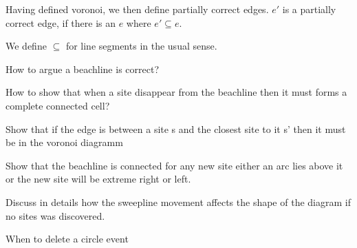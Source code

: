 \documentclass{article}
\begin{document}
Having defined voronoi, we then define partially correct edges. $e'$ is a partially correct edge, if there is an $e$ where $e' \subseteq e$.

We define $\subseteq$ for line segments in the usual sense. 

How to argue a beachline is correct?

How to show that when a site disappear from the beachline then it must forms a complete connected cell?

Show that if the edge is between a site s and the closest site to it s' then it must be in the voronoi diagramm

Show that the beachline is connected for any new site either an arc lies above it or the new site will be extreme right or left.

Discuss in details how the sweepline movement affects the shape of the diagram if no sites was discovered.

When to delete a circle event
\end{document}
